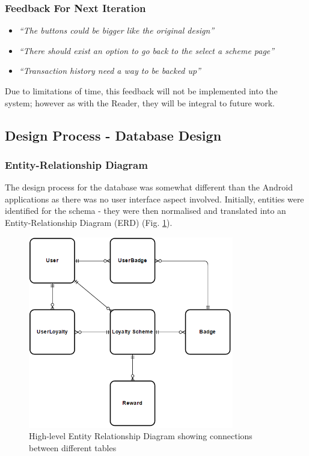 \subsubsection{Feedback For Next Iteration}
\begin{itemize}
  \item \textit{``The buttons could be bigger like the original design''}
  \item \textit{``There should exist an option to go back to the select a scheme page''}
  \item \textit{``Transaction history need a way to be backed up''}
\end{itemize}

Due to limitations of time, this feedback will not be implemented into the system; however as with the Reader, they will be integral to future work. 


\newpage
\subsection{Design Process - Database Design}
\subsubsection{Entity-Relationship Diagram}
The design process for the database was somewhat different than the Android applications as there was no user interface aspect involved. Initially, entities were identified for the schema - they were then normalised and translated into an Entity-Relationship Diagram (ERD) (Fig. \ref{fig:erd}).

\begin{figure}[H]
  \centering
    \includegraphics[width=0.8\textwidth]{img/erd.png}
      \caption{High-level Entity Relationship Diagram showing connections between different tables}
      \label{fig:erd}
\end{figure}

